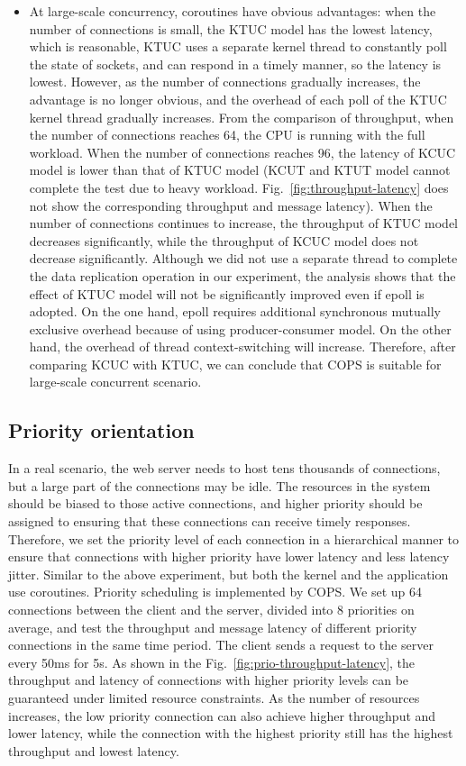 \documentclass[sigconf,review,anonymous]{acmart}
\begin{document}
\begin{itemize}[leftmargin=*]
\item At large-scale concurrency, coroutines have obvious advantages: when the number of connections is small, the KTUC model has the lowest latency, which is reasonable, KTUC uses a separate kernel thread to constantly poll the state of sockets, and can respond in a timely manner, so the latency is lowest. However, as the number of connections gradually increases, the advantage is no longer obvious, and the overhead of each poll of the KTUC kernel thread gradually increases. From the comparison of throughput, when the number of connections reaches 64, the CPU is running with the full workload. When the number of connections reaches 96, the latency of KCUC model is lower than that of KTUC model (KCUT and KTUT model cannot complete the test due to heavy workload. Fig.~\ref{fig:throughput-latency} does not show the corresponding throughput and message latency). When the number of connections continues to increase, the throughput of KTUC model decreases significantly, while the throughput of KCUC model does not decrease significantly. Although we did not use a separate thread to complete the data replication operation in our experiment, the analysis shows that the effect of KTUC model will not be significantly improved even if epoll is adopted. On the one hand, epoll requires additional synchronous mutually exclusive overhead because of using producer-consumer model. On the other hand, the overhead of thread context-switching will increase. Therefore, after comparing KCUC with KTUC, we can conclude that COPS is suitable for large-scale concurrent scenario.
\end{itemize}


\subsection{Priority orientation}

In a real scenario, the web server needs to host tens thousands of connections, but a large part of the connections may be idle. The resources in the system should be biased to those active connections, and higher priority should be assigned to ensuring that these connections can receive timely responses. Therefore, we set the priority level of each connection in a hierarchical manner to ensure that connections with higher priority have lower latency and less latency jitter. Similar to the above experiment, but both the kernel and the application use coroutines. Priority scheduling is implemented by COPS. We set up 64 connections between the client and the server, divided into 8 priorities on average, and test the throughput and message latency of different priority connections in the same time period. The client sends a request to the server every 50ms for 5s. As shown in the Fig.~\ref{fig:prio-throughput-latency}, the throughput and latency of connections with higher priority levels can be guaranteed under limited resource constraints. As the number of resources increases, the low priority connection can also achieve higher throughput and lower latency, while the connection with the highest priority still has the highest throughput and lowest latency.
\end{document}
